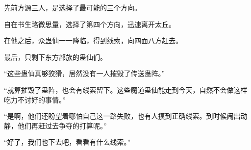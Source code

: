 \begin{this_body}
先前方源三人，是选择了最可能的三个方向。

自在书生略微思量，选择了第四个方向，迅速离开太丘。

在他之后，众蛊仙一一降临，得到线索，向四面八方赶去。

最后，只剩下东方部族的蛊仙们。

“这些蛊仙真够狡猾，居然没有一人摧毁了传送蛊阵。”

“就算摧毁了蛊阵，也会有线索留下。这些魔道蛊仙能走到今天，自然不会做这样吃力不讨好的事情。”

“是啊，他们还盼望着哪怕自己这一路失败，也有人摸到正确线索。到时候闹出动静，他们再赶过去争夺的打算呢。”

“好了，我们也下去吧，看看有什么线索。”

\end{this_body}

